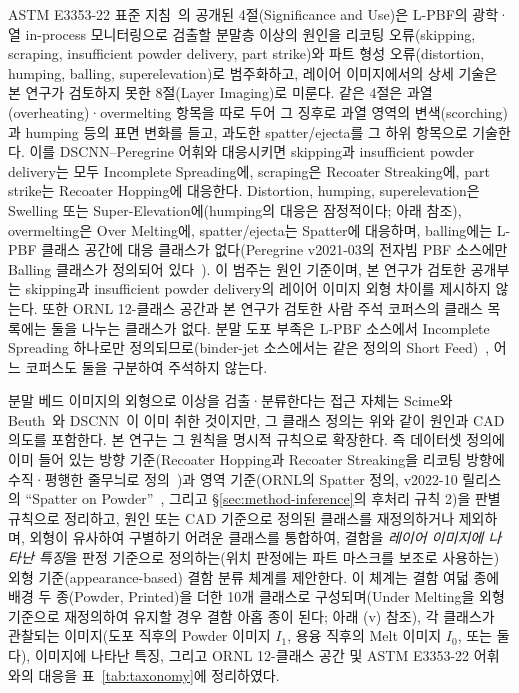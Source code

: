 ASTM E3353-22 표준 지침~\cite{ASTME3353}의 공개된 4절(Significance and
Use)은 L-PBF의 광학·열 in-process 모니터링으로 검출할 분말층 이상의
원인을 리코팅 오류(skipping, scraping, insufficient powder delivery,
part strike)와 파트 형성 오류(distortion, humping, balling,
superelevation)로 범주화하고, 레이어 이미지에서의 상세 기술은 본 연구가
검토하지 못한 8절(Layer Imaging)로 미룬다. 같은 4절은
과열(overheating)·overmelting 항목을 따로 두어 그 징후로 과열 영역의
변색(scorching)과 humping 등의 표면 변화를 들고, 과도한 spatter/ejecta를
그 하위 항목으로 기술한다. 이를 DSCNN--Peregrine 어휘와 대응시키면
skipping과 insufficient powder delivery는 모두 Incomplete Spreading에,
scraping은 Recoater Streaking에, part strike는 Recoater Hopping에
대응한다. Distortion, humping, superelevation은 Swelling 또는
Super-Elevation에(humping의 대응은 잠정적이다; 아래 참조), overmelting은
Over Melting에, spatter/ejecta는 Spatter에 대응하며, balling에는 L-PBF
클래스 공간에 대응 클래스가 없다(Peregrine v2021-03의 전자빔 PBF
소스에만 Balling 클래스가 정의되어 있다~\cite{Peregrine_v2021_03}). 이
범주는 원인 기준이며, 본 연구가 검토한 공개부는 skipping과 insufficient
powder delivery의 레이어 이미지 외형 차이를 제시하지 않는다. 또한 ORNL
12-클래스 공간과 본 연구가 검토한 사람 주석 코퍼스의 클래스 목록에는
둘을 나누는 클래스가 없다. 분말 도포 부족은 L-PBF 소스에서 Incomplete
Spreading 하나로만 정의되므로(binder-jet 소스에서는 같은 정의의 Short
Feed)~\cite{ORNL_CoRegistered_Dataset,Peregrine_v2021_03,Peregrine_v2022_10},
어느 코퍼스도 둘을 구분하여 주석하지 않는다.

분말 베드 이미지의 외형으로 이상을 검출·분류한다는 접근 자체는 Scime와
Beuth~\cite{Scime2018Anomaly}와 DSCNN~\cite{Scime2020DSCNN}이 이미 취한
것이지만, 그 클래스 정의는 위와 같이 원인과 CAD 의도를 포함한다. 본
연구는 그 원칙을 명시적 규칙으로 확장한다. 즉 데이터셋 정의에 이미 들어
있는 방향 기준(Recoater
Hopping과 Recoater Streaking을 리코팅 방향에 수직·평행한 줄무늬로
정의~\cite{Peregrine_v2021_03,Peregrine_v2022_10})과 영역 기준(ORNL의
Spatter 정의, v2022-10 릴리스의 ``Spatter on
Powder''~\cite{Peregrine_v2022_10}, 그리고 \S\ref{sec:method-inference}의
후처리 규칙 2)을 판별 규칙으로 정리하고, 원인 또는 CAD 기준으로 정의된
클래스를 재정의하거나 제외하며, 외형이 유사하여 구별하기 어려운 클래스를
통합하여, 결함을 \emph{레이어 이미지에 나타난 특징}을 판정 기준으로
정의하는(위치 판정에는 파트 마스크를 보조로 사용하는) 외형
기준(appearance-based) 결함 분류 체계를 제안한다. 이 체계는 결함 여덟
종에 배경 두 종(Powder, Printed)을 더한 10개 클래스로 구성되며(Under
Melting을 외형 기준으로 재정의하여 유지할 경우 결함 아홉 종이 된다;
아래 (v) 참조), 각 클래스가 관찰되는 이미지(도포 직후의 Powder 이미지
$I_1$, 용융 직후의 Melt 이미지 $I_0$, 또는 둘 다), 이미지에 나타난
특징, 그리고 ORNL 12-클래스 공간 및 ASTM E3353-22 어휘와의 대응을
표~\ref{tab:taxonomy}에 정리하였다.

